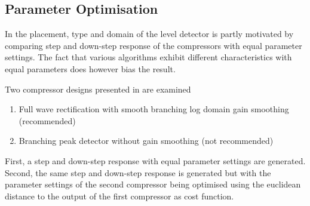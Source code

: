 \documentclass[../main2.tex]{subfiles}
\begin{document}
\subsection{Parameter Optimisation}\label{method_param_opt}
In \cite{reiss2012tutorial} the placement, type and domain of the level detector is partly motivated by comparing step and down-step response of the compressors with equal parameter settings. The fact that various algorithms exhibit different characteristics with equal parameters does however bias the result. 

Two compressor designs presented in \cite{reiss2012} are examined
\begin{enumerate}[label=(\Alph*)]
 \item Full wave rectification with smooth branching log domain gain smoothing (recommended)
\item  Branching peak detector without gain smoothing (not recommended)
\end{enumerate}
First, a step and down-step response with equal parameter settings are generated. Second, the same step and down-step response is generated but with the parameter  settings of the second compressor being optimised using the euclidean distance to the output of the first compressor as cost function. 
\end{document}

